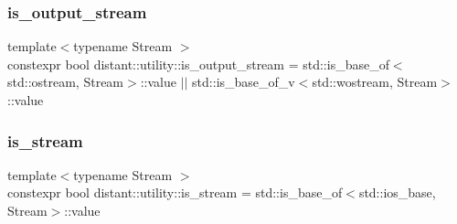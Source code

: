 \subsubsection{\texorpdfstring{is\+\_\+output\+\_\+stream}{is\_output\_stream}}
{\footnotesize\ttfamily template$<$typename Stream $>$ \\
constexpr bool distant\+::utility\+::is\+\_\+output\+\_\+stream = std\+::is\+\_\+base\+\_\+of$<$std\+::ostream, Stream$>$\+::value $\vert$$\vert$ std\+::is\+\_\+base\+\_\+of\+\_\+v$<$std\+::wostream, Stream$>$\+::value}

\mbox{\label{namespacedistant_1_1utility_ab7c9156805fa0568d78be4cb580ae173}} 
\subsubsection{\texorpdfstring{is\+\_\+stream}{is\_stream}}
{\footnotesize\ttfamily template$<$typename Stream $>$ \\
constexpr bool distant\+::utility\+::is\+\_\+stream = std\+::is\+\_\+base\+\_\+of$<$std\+::ios\+\_\+base, Stream$>$\+::value}

